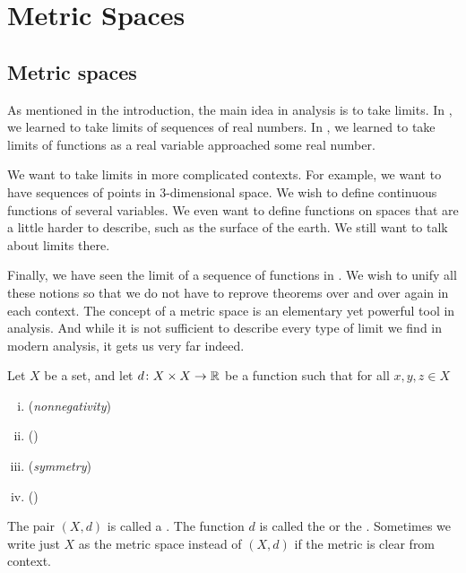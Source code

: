 \chapter{Metric Spaces} \label{ms:chapter}


\section{Metric spaces}
\label{sec:metric}


As mentioned in the introduction, the main idea in analysis is to take
limits.  In , we learned to take limits of sequences of
real numbers.  In , we learned to take limits
of functions as a real variable approached some real number.

We want to take limits in more complicated contexts.  For
example, we want to have sequences of points in 3-dimensional space.
We wish to define continuous functions of several variables.
We even want to define functions on spaces that are a little harder to
describe, such as the surface of the earth.  We still want to talk about
limits there.

Finally, we have seen the limit of a sequence of
functions in .
We wish to unify all these notions so that we do not have to
reprove theorems over and over again in each context.  The concept of a
metric space is an elementary yet powerful tool in analysis.  And while it
is not sufficient to describe every type of limit we find in modern
analysis, it gets us very far indeed.

\begin{defn}
Let $X$ be a set, and let
$d \colon X \times X \to {\mathbb{R}}$
be a function such that for all $x,y,z \in X$
\begin{enumerate}[(i)]
%
\item \label{metric:pos}
(\emph{nonnegativity})
%
\item \label{metric:zero}
(\emph{})
%
\item \label{metric:com}
(\emph{symmetry})
%
\item \label{metric:triang}
(\emph{})
\end{enumerate}
The pair $(X,d)$ is called a \emph{}.  The
function $d$ is called the \emph{} or the
\emph{}.
Sometimes we write just $X$ as the metric space instead of $(X,d)$
if the metric is clear from context.
\end{defn}

